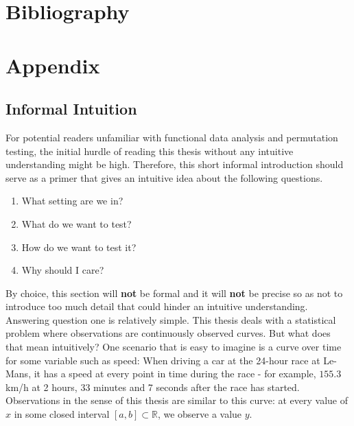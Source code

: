 \documentclass[12pt, a4paper]{article}
\theoremstyle{MAstyle} \newtheorem{assumption}{Assumption}[section]
\theoremstyle{MAstyle} \newtheorem{definition}{Definition}[section]
\theoremstyle{MAstyle} \newtheorem{theorem}{Theorem}[section]
\begin{document}
		
	
	\newpage
	\section{Bibliography}
	\printbibliography[heading=none]
	
	\newpage
	\cleardoublepage
	\setcounter{page}{1}
	\section{Appendix}
	
		\subsection{Informal Intuition}\label{Intuition}
			For potential readers unfamiliar with functional data analysis and permutation testing, the initial hurdle of reading this thesis without any intuitive understanding might be high. Therefore, this short informal introduction should serve as a primer that gives an intuitive idea about the following questions.
			\begin{multicols}{2}
				\begin{enumerate}
					\item What setting are we in?
					\item What do we want to test?
					\item How do we want to test it?
					\item Why should I care?
				\end{enumerate}
			\end{multicols}
			By choice, this section will \textbf{not} be formal and it will \textbf{not} be precise so as not to introduce too much detail that could hinder an intuitive understanding.\\
			
			Answering question one is relatively simple. This thesis deals with a statistical problem where observations are continuously observed curves. But what does that mean intuitively? One scenario that is easy to imagine is a curve over time for some variable such as speed: When driving a car at the 24-hour race at Le-Mans, it has a speed at every point in time during the race - for example, $155.3$ km/h at 2 hours, 33 minutes and 7 seconds after the race has started. Observations in the sense of this thesis are similar to this curve: at every value of $x$ in some closed interval $[a,b] \subset \mathbb{R}$, we observe a value $y$.\\
			
\end{document}

